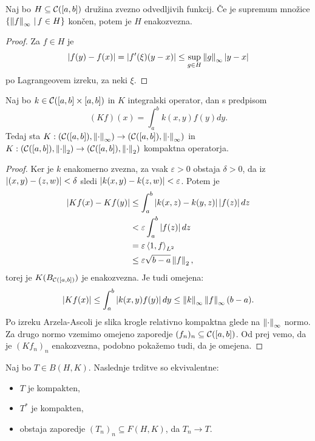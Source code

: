 \begin{trditev}
  Naj bo $H \subseteq \mathcal{C}([a,b])$ družina zvezno odvedljivih funkcij.
  Če je supremum množice $\{ \left\lVert f\right\rVert_\infty \,|\, f \in H \}$ končen, potem je
  $H$ enakozvezna.
\end{trditev}

\begin{proof}
  Za $f \in H$ je
  \[
	\left| f(y) - f(x) \right| = \left| f'(\xi) (y-x) \right| \le \sup_{g \in H} \left\lVert g\right\rVert_\infty
	\left| y-x \right|
  \]
  po Lagrangeovem izreku, za neki $\xi$.
\end{proof}

\begin{izrek}
  Naj bo $k \in \mathcal{C}([a,b] \times [a,b])$ in $K$ integralski operator, dan s
  predpisom
  \[
	(Kf)(x) = \int_a^b k(x,y) f(y) dy.
  \]
  Tedaj sta $K: (\mathcal{C}([a,b]), \left\lVert\cdot\right\rVert_\infty) \to (\mathcal{C}([a,b]),
  \left\lVert\cdot\right\rVert_\infty)$ in $K: (\mathcal{C}([a,b]), \left\lVert\cdot\right\rVert_2) \to
  (\mathcal{C}([a,b]), \left\lVert\cdot\right\rVert_2)$ kompaktna operatorja.
\end{izrek}

\begin{proof}
  Ker je $k$ enakomerno zvezna, za vsak $\varepsilon > 0$ obstaja $\delta > 0$,
  da iz $\left| (x,y) - (z,w) \right| < \delta$ sledi $\left| k(x,y) - k(z,w) \right| <
  \varepsilon$.
  Potem je
  \begin{align*}
	\left| Kf(x) - Kf(y) \right|
	&\le \int_a^b \left| k(x,z) - k(y,z) \right| \left| f(z) \right| dz \\
	&< \varepsilon \int_a^b \left| f(z) \right| dz \\
	&= \varepsilon \left< 1, f \right>_{L^2} \\
	&\le \varepsilon \sqrt{b-a} \left\lVert f\right\rVert_2,
  \end{align*}
  torej je $K(B_{\mathcal{C}([a,b])})$ je enakozvezna.
  Je tudi omejena:
  \[
	\left| Kf(x) \right|
	\le \int_a^b \left| k(x,y) f(y) \right| dy
	\le \left\lVert k\right\rVert_\infty \left\lVert f\right\rVert_\infty (b-a).
  \]
  Po izreku Arzela-Ascoli je slika krogle relativno kompaktna glede na
  $\left\lVert\cdot\right\rVert_\infty$ normo.
  Za drugo normo vzemimo omejeno zaporedje $(f_n)_n \subseteq \mathcal{C}([a,b])$.
  Od prej vemo, da je $(Kf_n)_n$ enakozvezna, podobno pokažemo tudi, da je
  omejena.
\end{proof}



\begin{izrek}
  Naj bo $T \in B(H,K)$.
  Naslednje trditve so ekvivalentne:
  \begin{itemize}
  \item $T$ je kompakten,
  \item $T^*$ je kompakten,
  \item obstaja zaporedje $(T_n)_n \subseteq F(H,K)$, da $T_n \to T$.
  \end{itemize}
\end{izrek}

